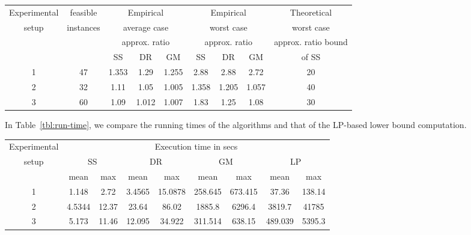 \documentclass[conference]{IEEEtran}
\begin{document}
\begin{table*}[t]
  \centering
\caption{Performance Comparison of the Algorithms against LP-based Lower Bound}
\label{tbl:lp-compare}
\scriptsize
  \begin{tabular}{|c|c|c|c|c|c|c|c|c|}\hline
    Experimental & feasible & \multicolumn{3}{c|}{Empirical} & \multicolumn{3}{c|}{Empirical} & Theoretical\\
    setup & instances & \multicolumn{3}{c|}{average case} & \multicolumn{3}{c|}{worst case} & worst case\\
   & & \multicolumn{3}{c|}{approx. ratio} & \multicolumn{3}{c|}{approx. ratio} & approx. ratio bound\\
   & & SS & DR & GM & SS & DR & GM & of SS\\
    \hline
   1 & 47 & 1.353 & 1.29& 1.255 & 2.88 & 2.88 & 2.72 & 20\\
   2 & 32 & 1.11 & 1.05 & 1.005 & 1.358& 1.205& 1.057& 40\\
   3 & 60& 1.09 & 1.012& 1.007 & 1.83 & 1.25 & 1.08 & 30 \\ 
  \hline
\end{tabular}
\normalsize
\end{table*} 
In Table~\ref{tbl:run-time}, we compare the running times of the algorithms and that of the LP-based lower bound computation.
\begin{table*}[t]
  \centering
\caption{Execution Times of the Algorithms, and the LP-based Lower Bound Computation}
\label{tbl:run-time}
\scriptsize
  \begin{tabular}{|c|c|c|c|c|c|c|c|c|}\hline
    Experimental &  \multicolumn{8}{c|}{Execution time in secs} \\
    setup & \multicolumn{2}{c|}{SS} & \multicolumn{2}{c|}{DR} & \multicolumn{2}{c|}{GM} & \multicolumn{2}{c|}{LP}\\
   & mean & max & mean & max & mean & max & mean & max\\
    \hline
   1 & 1.148 & 2.72 & 3.4565 & 15.0878 & 258.645 & 673.415 & 37.36 & 138.14\\
   2 & 4.5344 & 12.37 & 23.64 & 86.02 & 1885.8 & 6296.4 & 3819.7 & 41785\\
   3 & 5.173 & 11.46 & 12.095 & 34.922& 311.514& 638.15 & 489.039& 5395.3\\ 
  \hline
\end{tabular}
\normalsize
\end{table*}
\end{document}

